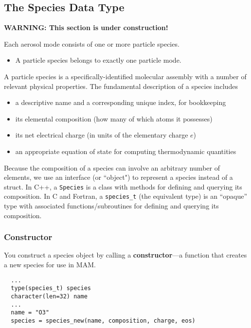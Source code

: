 \subsection{The Species Data Type}

{\bf WARNING: This section is under construction!}

Each aerosol mode consists of one or more particle species.

\begin{itemize}
  \item \assume A particle species belongs to exactly one particle mode.
\end{itemize}

A particle species is a specifically-identified molecular assembly with
a number of relevant physical properties. The fundamental description of a
species includes

\begin{itemize}
  \item a descriptive name and a corresponding unique index, for bookkeeping
  \item its elemental composition (how many of which atoms it possesses)
  \item its net electrical charge (in units of the elementary charge $e$)
  \item an appropriate equation of state for computing thermodynamic quantities
\end{itemize}

Because the composition of a species can involve an arbitrary number of
elements, we use an interface (or ``object") to represent a species instead of
a struct. In C++, a \verb|Species| is a class with methods for defining and
querying its composition. In C and Fortran, a \verb|species_t| (the equivalent
type) is an ``opaque'' type with associated functions/subroutines for defining
and querying its composition.

\subsubsection*{Constructor}

You construct a species object by calling a {\bf constructor}---a
function that creates a new species for use in MAM.

\begin{verbatim}
  ...
  type(species_t) species
  character(len=32) name
  ...
  name = "O3"
  species = species_new(name, composition, charge, eos)

\end{verbatim}

